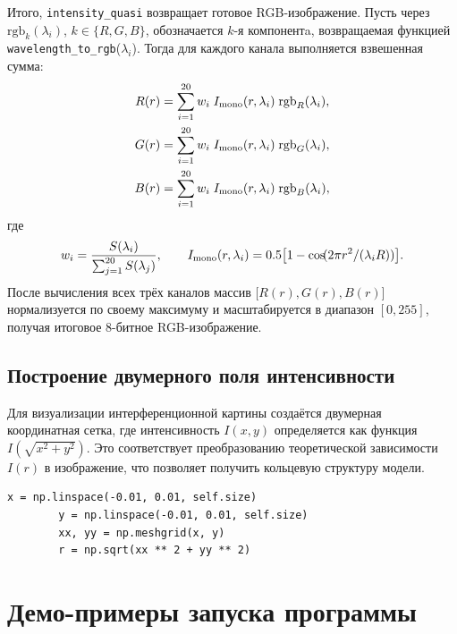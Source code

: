 \documentclass[a4paper,11pt]{article}
\theoremstyle{definition}
\begin{document}
\begin{itemize}
        Итого, \texttt{intensity\_quasi} возвращает готовое RGB-изображение. Пусть через
        \(\mathrm{rgb}_k(\lambda_i)\), \(k\in\{R,G,B\}\), обозначается \(k\)-я компонентa,
        возвращаемая функцией \texttt{wavelength\_to\_rgb}(\(\lambda_i\)).
        Тогда для каждого канала выполняется взвешенная сумма:
        \[
            \begin{aligned}
                R(r) &= \sum_{i=1}^{20} w_i \; I_{\rm mono}(r,\lambda_i)\;\mathrm{rgb}_R(\lambda_i),\\
                G(r) &= \sum_{i=1}^{20} w_i \; I_{\rm mono}(r,\lambda_i)\;\mathrm{rgb}_G(\lambda_i),\\
                B(r) &= \sum_{i=1}^{20} w_i \; I_{\rm mono}(r,\lambda_i)\;\mathrm{rgb}_B(\lambda_i),
            \end{aligned}
        \]
        где
        \[
            w_i = \frac{S(\lambda_i)}{\sum_{j=1}^{20}S(\lambda_j)},
            \qquad
            I_{\rm mono}(r,\lambda_i) = 0.5\bigl[1 - \cos\!(2\pi r^2/(\lambda_i R))\bigr].
        \]
        После вычисления всех трёх каналов массив \(\bigl[R(r),G(r),B(r)\bigr]\) нормализуется
        по своему максимуму и масштабируется в диапазон \([0,255]\), получая итоговое 8-битное RGB-изображение.

    \end{itemize}

    \subsection{Построение двумерного поля интенсивности}
    Для визуализации интерференционной картины создаётся двумерная координатная сетка, где интенсивность \( I(x,y) \)
    определяется как функция \( I\left(\sqrt{x^2+y^2}\right) \). Это соответствует преобразованию теоретической
    зависимости \( I(r) \) в изображение, что позволяет получить кольцевую структуру модели.

    \begin{lstlisting}[language=MyPython,label={lst:lstlisting3}]
        x = np.linspace(-0.01, 0.01, self.size)
        y = np.linspace(-0.01, 0.01, self.size)
        xx, yy = np.meshgrid(x, y)
        r = np.sqrt(xx ** 2 + yy ** 2)
    \end{lstlisting}


    \section{Демо-примеры запуска программы}
\end{document}
